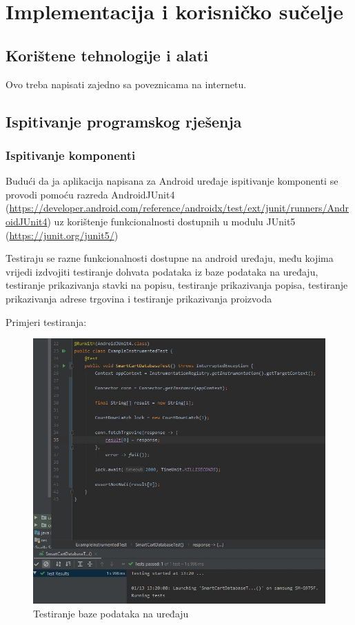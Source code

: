 \chapter{Implementacija i korisničko sučelje}
	\section{Korištene tehnologije i alati}
		Ovo treba napisati zajedno sa poveznicama na internetu.
		\eject
	\section{Ispitivanje programskog rješenja}
		\subsection{Ispitivanje komponenti}
			
			Budući da ja aplikacija napisana za Android uređaje ispitivanje komponenti
			se provodi pomoću razreda AndroidJUnit4 (\url{https://developer.android.com/reference/androidx/test/ext/junit/runners/AndroidJUnit4})
			uz korištenje funkcionalnosti dostupnih u modulu JUnit5 (\url{https://junit.org/junit5/})
			
			Testiraju se razne funkcionalnosti dostupne na android uređaju, među kojima
			vrijedi izdvojiti testiranje dohvata podataka iz baze podataka na uređaju, testiranje prikazivanja
			stavki na popisu, testiranje prikazivanja popisa, testiranje prikazivanja adrese trgovina i testiranje
			prikazivanja proizvoda
			
			Primjeri testiranja:
			
			\begin{figure}[H]
				\centering
				\includegraphics[scale=0.7]{slike/androidTest1.jpg}
				\caption{Testiranje baze podataka na uređaju}
				\label{fig:test_uredaj_db}
			\end{figure}
		
